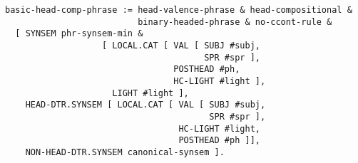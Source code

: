 \documentclass[a4paper]{article}
\begin{document}
{\small\begin{verbatim}
basic-head-comp-phrase := head-valence-phrase & head-compositional &
                          binary-headed-phrase & no-ccont-rule &
  [ SYNSEM phr-synsem-min &
                   [ LOCAL.CAT [ VAL [ SUBJ #subj,
                                       SPR #spr ],
                                 POSTHEAD #ph,
                                 HC-LIGHT #light ],
                     LIGHT #light ],
    HEAD-DTR.SYNSEM [ LOCAL.CAT [ VAL [ SUBJ #subj,
                                        SPR #spr ],
                                  HC-LIGHT #light,
                                  POSTHEAD #ph ]], 
    NON-HEAD-DTR.SYNSEM canonical-synsem ].
\end{verbatim}}
\end{document}
